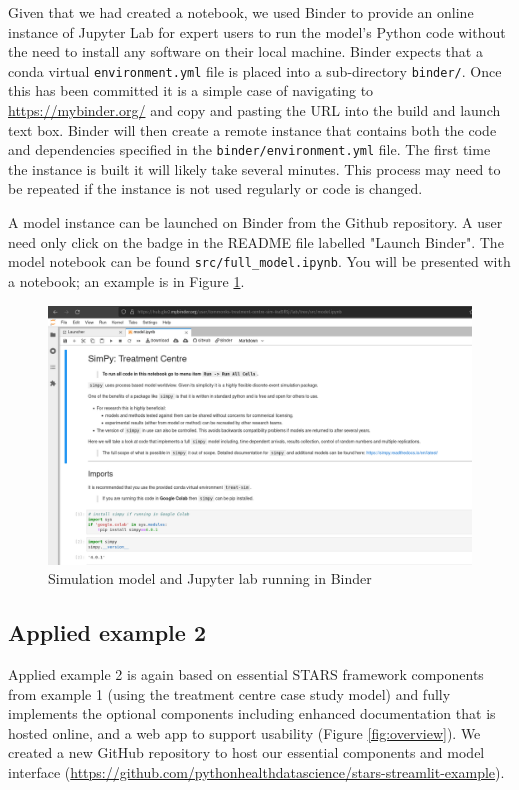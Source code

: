 \documentclass[]{interact}
\theoremstyle{plain}%
\theoremstyle{definition}
\theoremstyle{remark}
\begin{document}
Given that we had created a notebook, we used Binder to provide an online instance of Jupyter Lab for expert users to run the model's Python code without the need to install any software on their local machine.  Binder expects that a conda virtual \verb|environment.yml| file is placed into a sub-directory \verb|binder/|. Once this has been committed it is a simple case of navigating to \url{https://mybinder.org/} and copy and pasting the URL into the build and launch text box. Binder will then create a remote instance that contains both the code and dependencies specified in the \verb|binder/environment.yml| file.  The first time the instance is built it will likely take several minutes.  This process may  need to be repeated if the instance is not used regularly or code is changed.

A model instance can be launched on Binder from the Github repository. A user need only click on the badge in the README file labelled "Launch Binder". The model notebook can be found \verb|src/full_model.ipynb|.  You will be presented with a notebook; an example is in Figure \ref{fig:jupyter}.

\begin{figure}[ht]
\centering
\includegraphics[scale=0.25]{images/jupyter.png}
\caption{Simulation model and Jupyter lab running in Binder}
\label{fig:jupyter}
\end{figure}

\subsection{Applied example 2}

Applied example 2 is again based on essential STARS framework components from example 1 (using the treatment centre case study model) and fully implements the optional components including enhanced documentation that is hosted online, and a web app to support usability (Figure \ref{fig:overview}).  We created a new GitHub repository to host our essential components and model interface (\url{https://github.com/pythonhealthdatascience/stars-streamlit-example}).
\end{document}

